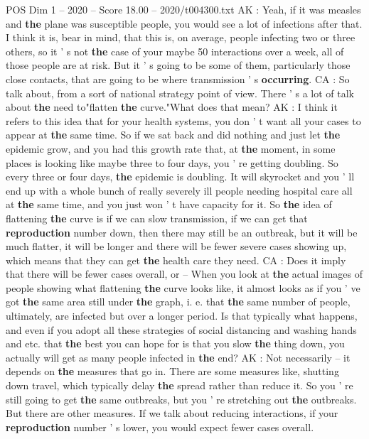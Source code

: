 \begin{textsample}{POS Dim 1 – 2020 – Score 18.00 – 2020/t004300.txt}
AK : Yeah, if it was measles and \textbf{the} plane was susceptible people, you would see a lot of infections after that.
I think it is, bear in mind, that this is, on average, people infecting two or three others, so it ' s not \textbf{the} case of your maybe 50 interactions over a week, all of those people are at risk.
But it ' s going to be some of them, particularly those close contacts, that are going to be where transmission ' s \textbf{occurring}.
CA : So talk about, from a sort of national strategy point of view.
There ' s a lot of talk about \textbf{the} need to"flatten \textbf{the} curve."What does that mean?
AK : I think it refers to this idea that for your health systems, you don ' t want all your cases to appear at \textbf{the} same time.
So if we sat back and did nothing and just let \textbf{the} epidemic grow, and you had this growth rate that, at \textbf{the} moment, in some places is looking like maybe three to four days, you ' re getting doubling.
So every three or four days, \textbf{the} epidemic is doubling.
It will skyrocket and you ' ll end up with a whole bunch of really severely ill people needing hospital care all at \textbf{the} same time, and you just won ' t have capacity for it.
So \textbf{the} idea of flattening \textbf{the} curve is if we can slow transmission, if we can get that \textbf{reproduction} number down, then there may still be an outbreak, but it will be much flatter, it will be longer and there will be fewer severe cases showing up, which means that they can get \textbf{the} health care they need.
CA : Does it imply that there will be fewer cases overall, or -- When you look at \textbf{the} actual images of people showing what flattening \textbf{the} curve looks like, it almost looks as if you ' ve got \textbf{the} same area still under \textbf{the} graph, i. e. that \textbf{the} same number of people, ultimately, are infected but over a longer period.
Is that typically what happens, and even if you adopt all these strategies of social distancing and washing hands and etc. that \textbf{the} best you can hope for is that you slow \textbf{the} thing down, you actually will get as many people infected in \textbf{the} end?
AK : Not necessarily -- it depends on \textbf{the} measures that go in.
There are some measures like, shutting down travel, which typically delay \textbf{the} spread rather than reduce it.
So you ' re still going to get \textbf{the} same outbreaks, but you ' re stretching out \textbf{the} outbreaks.
But there are other measures.
If we talk about reducing interactions, if your \textbf{reproduction} number ' s lower, you would expect fewer cases overall.

\end{textsample}
